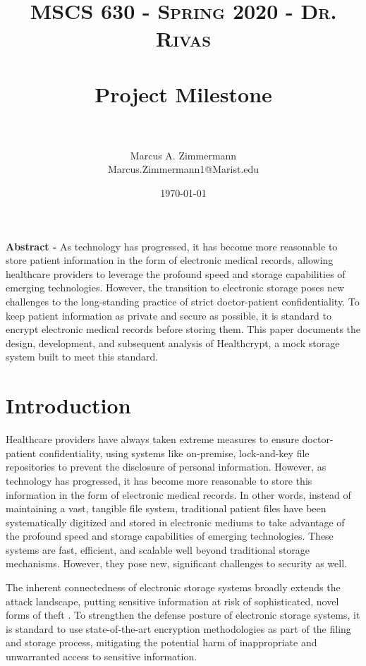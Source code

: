 \documentclass[letterpaper, 10pt,DIV=13]{scrartcl}
\title{	
   \normalfont \normalsize
   \textsc{MSCS 630 - Spring 2020 - Dr. Rivas} \\ [10pt] %
   \horrule{0.5pt} \\[0.25cm] 	%
   \huge Project Milestone  \\     	    %
   \horrule{0.5pt} \\[0.25cm] 	%
}
\author{Marcus A. Zimmermann \\ \normalsize Marcus.Zimmermann1@Marist.edu}
\date{\normalsize\today} 	%
\begin{document}
\maketitle %

\begin{multicols}{2}

\begin{spacing}{1.25}
\textbf{Abstract -} As technology has progressed, it has become more reasonable to store patient information in the form of electronic medical records, allowing healthcare providers to leverage the profound speed and storage capabilities of emerging technologies. However, the transition to electronic storage poses new challenges to the long-standing practice of strict doctor-patient confidentiality. To keep patient information as private and secure as possible, it is standard to encrypt electronic medical records before storing them. This paper documents the design, development, and subsequent analysis of Healthcrypt, a mock storage system built to meet this standard.
\end{spacing}

\vspace{-2.5pt}

\section*{Introduction}
\begin{spacing}{1.25}
Healthcare providers have always taken extreme measures to ensure doctor-patient confidentiality, using systems like on-premise, lock-and-key file repositories to prevent the disclosure of personal information. However, as technology has progressed, it has become more reasonable to store this information in the form of electronic medical records. In other words, instead of maintaining a vast, tangible file system, traditional patient files have been systematically digitized and stored in electronic mediums to take advantage of the profound speed and storage capabilities of emerging technologies. These systems are fast, efficient, and scalable well beyond traditional storage mechanisms. However, they pose new, significant challenges to security as well.

The inherent connectedness of electronic storage systems broadly extends the attack landscape, putting sensitive information at risk of sophisticated, novel forms of theft \cite{nistitl2017}. To strengthen the defense posture of electronic storage systems, it is standard to use state-of-the-art encryption methodologies as part of the filing and storage process, mitigating the potential harm of inappropriate and unwarranted access to sensitive information.


\end{spacing}
\end{multicols}
\end{document}
